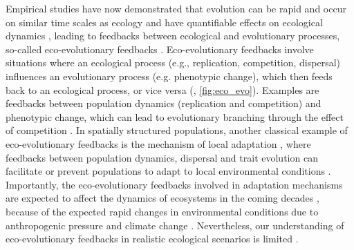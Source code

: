 Empirical studies have now demonstrated that evolution can be rapid and occur on similar time scales as ecology \citep{Hairston2005, Pelletier2009} and have quantifiable effects on ecological dynamics \citep{Ezard2009}, leading to feedbacks between ecological and evolutionary processes, so-called eco-evolutionary feedbacks \citep{Pelletier2009,Schoener2011,Govaert2019}. 
% 
Eco-evolutionary feedbacks involve situations where an ecological process (e.g., replication, competition, dispersal) influences an evolutionary process (e.g. phenotypic change), which then feeds back to an ecological process, or vice versa (\cite{Govaert2019}, \cref{fig:eco_evo}). Examples are feedbacks between population dynamics (replication and competition) and phenotypic change, which can lead to evolutionary branching through the effect of competition \citep{Dieckmann1999}.
% 
In spatially structured populations, another classical example of eco-evolutionary feedbacks is the mechanism of local adaptation \citep{Savolainen2007}, where feedbacks between population dynamics, dispersal and trait evolution can facilitate or prevent populations to adapt to local environmental conditions \citep{Meszena1997,Doebeli2003}.
% 
Importantly, the eco-evolutionary feedbacks involved in adaptation mechanisms are expected to affect the dynamics of ecosystems in the coming decades \citep{Norberg2012,Urban2016}, because of the expected rapid changes in environmental conditions due to anthropogenic pressure and climate change \citep{Ellis2011,Midgley2019}.
% 
Nevertheless, our understanding of eco-evolutionary feedbacks in realistic ecological scenarios is limited \citep{Lion2022}.
% 
% 
% 
% 

